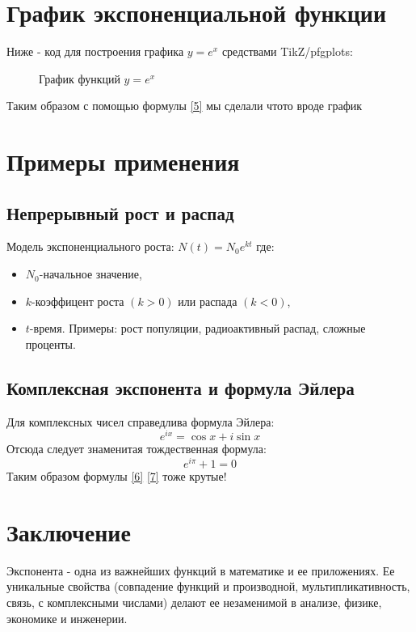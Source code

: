 \documentclass[12pt,a4paper]{article}
\begin{document}
\section{График экспоненциальной функции}
Ниже - код для построения графика $y=e^x$ средствами TikZ/pfgplots:
\begin{figure}[h!]
\centering
{}
\caption{График функций $y=e^x$}
\label{fig:exp}
\end{figure}
Таким образом с помощью формулы \ref{5} мы сделали чтото вроде график
\section{Примеры применения}
\subsection{Непрерывный рост и распад}
Модель экспоненциального роста:
$N(t)=N_{0}e^{kt}$
где:
\begin{itemize}
\item$N_{0}$-начальное значение,
\item$k$-коэффицент роста $(k>0)$ или распада $(k<0)$,
\item$t$-время.
Примеры: рост популяции, радиоактивный распад, сложные проценты.
\end{itemize}
\subsection{Комплексная экспонента и формула Эйлера}
Для комплексных чисел справедлива формула Эйлера:
\begin{equation}\label{6}
e^{ix}=\cos x+i\sin x
\end{equation}
Отсюда следует знаменитая тождественная формула:
\begin{equation}\label{7}
e^{i\pi}+1=0
\end{equation}
Таким образом формулы  \ref{6} \ref{7} тоже крутые!
\section{Заключение}
Экспонента - одна из важнейших функций в математике и ее приложениях. Ее уникальные свойства (совпадение функций и производной, мультипликативность, связь, с комплексными числами) делают ее незаменимой в анализе, физике, экономике и инженерии.  
\end{document}
